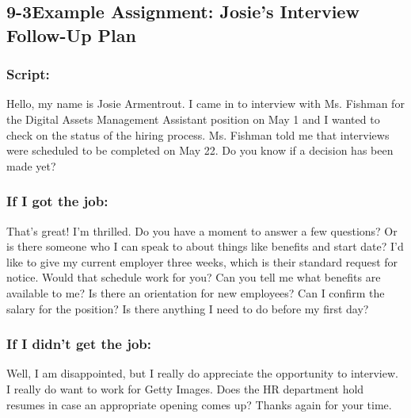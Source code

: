 \pagebreak \subsection*{9-3\quad Example Assignment: Josie's Interview Follow-Up Plan}
\subsubsection*{Script:}
\break Hello, my name is Josie Armentrout. I came in to interview with Ms. Fishman for the Digital Assets Management Assistant position on May 1 and I wanted to check on the status of the hiring process. Ms. Fishman told me that interviews were scheduled to be completed on May 22. Do you know if a decision has been made yet?

\subsubsection*{If I got the job:}
\break That's great! I'm thrilled.
\break Do you have a moment to answer a few questions? Or is there someone who I can speak to about things like benefits and start date?
\break I'd like to give my current employer three weeks, which is their standard request for notice. Would that schedule work for you?
\break Can you tell me what benefits are available to me? Is there an orientation for new employees?
\break Can I confirm the salary for the position?
\break Is there anything I need to do before my first day?

\subsubsection*{If I didn't get the job:}
\break Well, I am disappointed, but I really do appreciate the opportunity to interview. I really do want to work for Getty Images. Does the HR department hold resumes in case an appropriate opening comes up?
\break Thanks again for your time.

